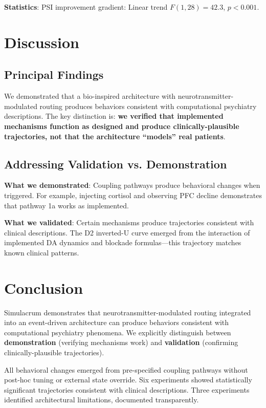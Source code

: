 \documentclass[10pt,a4paper]{article}
\begin{document}
\textbf{Statistics}: PSI improvement gradient: Linear trend $F(1,28)=42.3$, $p<0.001$.

\section{Discussion}

\subsection{Principal Findings}

We demonstrated that a bio-inspired architecture with neurotransmitter-modulated routing produces behaviors consistent with computational psychiatry descriptions. The key distinction is: \textbf{we verified that implemented mechanisms function as designed and produce clinically-plausible trajectories, not that the architecture ``models'' real patients}.

\subsection{Addressing Validation vs. Demonstration}

\textbf{What we demonstrated}: Coupling pathways produce behavioral changes when triggered. For example, injecting cortisol and observing PFC decline demonstrates that pathway 1a works as implemented.

\textbf{What we validated}: Certain mechanisms produce trajectories consistent with clinical descriptions. The D2 inverted-U curve emerged from the interaction of implemented DA dynamics and blockade formulas---this trajectory matches known clinical patterns.

\section{Conclusion}

Simulacrum demonstrates that neurotransmitter-modulated routing integrated into an event-driven architecture can produce behaviors consistent with computational psychiatry phenomena. We explicitly distinguish between \textbf{demonstration} (verifying mechanisms work) and \textbf{validation} (confirming clinically-plausible trajectories).

All behavioral changes emerged from pre-specified coupling pathways without post-hoc tuning or external state override. Six experiments showed statistically significant trajectories consistent with clinical descriptions. Three experiments identified architectural limitations, documented transparently.
\end{document}
